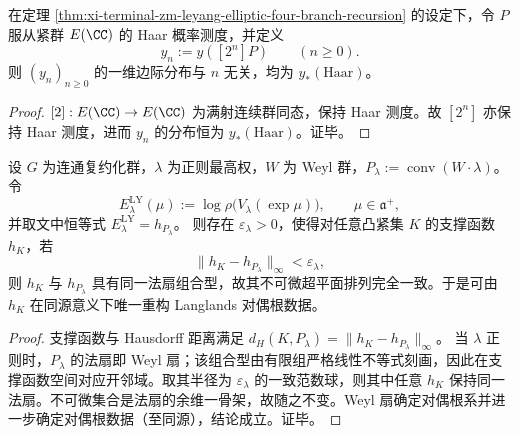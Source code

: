 \begin{corollary}[倍点时间链的边际平稳性]\label{cor:xi-terminal-zm-leyang-elliptic-doubling-stationarity}
在定理 \ref{thm:xi-terminal-zm-leyang-elliptic-four-branch-recursion} 的设定下，令 \(P\) 服从紧群 \(E(\CC)\) 的 Haar 概率测度，并定义
\[
y_n:=y([2^n]P)\qquad(n\ge 0).
\]
则 \((y_n)_{n\ge 0}\) 的一维边际分布与 \(n\) 无关，均为 \(y_*(\mathrm{Haar})\)。
\end{corollary}
\begin{proof}
\([2]:E(\CC)\to E(\CC)\) 为满射连续群同态，保持 Haar 测度。故 \([2^n]\) 亦保持 Haar 测度，进而 \(y_n\) 的分布恒为 \(y_*(\mathrm{Haar})\)。证毕。
\end{proof}

\begin{theorem}\label{thm:xi-terminal-zm-leyang-langlands-dual-root-stability}
设 \(G\) 为连通复约化群，\(\lambda\) 为正则最高权，\(W\) 为 Weyl 群，\(P_\lambda:=\operatorname{conv}(W\!\cdot\!\lambda)\)。
令
\[
E^{\mathrm{LY}}_\lambda(\mu):=\log\rho\!\bigl(V_\lambda(\exp\mu)\bigr),\qquad \mu\in\mathfrak a^+,
\]
并取文中恒等式 \(E^{\mathrm{LY}}_\lambda=h_{P_\lambda}\)。
则存在 \(\varepsilon_\lambda>0\)，使得对任意凸紧集 \(K\) 的支撑函数 \(h_K\)，若
\[
\|h_K-h_{P_\lambda}\|_\infty<\varepsilon_\lambda,
\]
则 \(h_K\) 与 \(h_{P_\lambda}\) 具有同一法扇组合型，故其不可微超平面排列完全一致。于是可由 \(h_K\) 在同源意义下唯一重构 Langlands 对偶根数据。
\end{theorem}
\begin{proof}
支撑函数与 Hausdorff 距离满足
\(
d_H(K,P_\lambda)=\|h_K-h_{P_\lambda}\|_\infty
\)。
当 \(\lambda\) 正则时，\(P_\lambda\) 的法扇即 Weyl 扇；该组合型由有限组严格线性不等式刻画，因此在支撑函数空间对应开邻域。取其半径为 \(\varepsilon_\lambda\) 的一致范数球，则其中任意 \(h_K\) 保持同一法扇。不可微集合是法扇的余维一骨架，故随之不变。Weyl 扇确定对偶根系并进一步确定对偶根数据（至同源），结论成立。证毕。
\end{proof}

